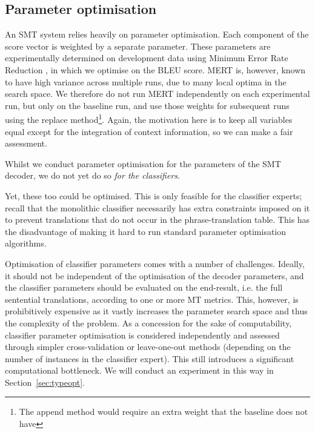 \documentclass[smallextended]{svjour3}       %
\theoremstyle{break}
\begin{document}
\subsection{Parameter optimisation}

An SMT system relies heavily on parameter optimisation. Each component of the
score vector is weighted by a separate parameter. These parameters are
experimentally determined on development data using Minimum Error Rate
Reduction \citep{MERT}, in which we optimise on the BLEU score. MERT is,
however, known to have high variance across multiple runs, due to many local
optima in the search space. We therefore do not run MERT independently on each
experimental run, but only on the baseline run, and use those weights for
subsequent runs using the replace method\footnote{The append method would
require an extra weight that the baseline does not have}. Again, the motivation
here is to keep all variables equal except for the integration of context
information, so we can make a fair assessment.


Whilst we conduct parameter optimisation for the parameters of the SMT
decoder, we do not yet do so \emph{for the classifiers}. 

Yet, these too could be optimised. This is only feasible for the classifier
experts; recall that the monolithic classifier necessarily has extra
constraints imposed on it to prevent translations that do not occur in the
phrase-translation table. This has the disadvantage of making it hard to run
standard parameter optimisation algorithms. 

Optimisation of classifier parameters comes with a number of challenges.
Ideally, it should not be independent of the optimisation of the decoder
parameters, and the classifier parameters should be evaluated on the
end-result, i.e. the full sentential translations, according to one or more MT
metrics. This, however, is prohibitively expensive as it vastly increases the
parameter search space and thus the complexity of the problem. As a concession
for the sake of computability, classifier parameter optimisation is considered
independently and assessed through simpler cross-validation or leave-one-out
methods (depending on the number of instances in the classifier expert).  This
still introduces a significant computational bottleneck.  We will conduct an
experiment in this way in Section~\ref{sec:typeopt}.
\end{document}
